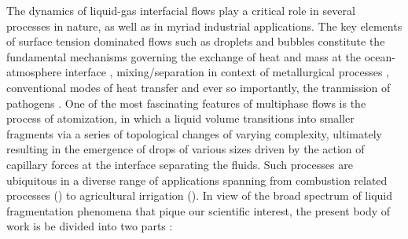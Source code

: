 The dynamics of liquid-gas interfacial flows play a critical role in several processes in nature, 
as well as in myriad industrial applications. 
The key elements of surface tension dominated flows such as droplets and bubbles constitute the  
fundamental mechanisms governing the exchange of heat and mass at the ocean-atmosphere interface \cite{seinfeld1998air,deike}, 
mixing/separation in context of metallurgical processes \cite{johansen1988fluid,metal},  
conventional modes of heat transfer \cite{deckwer1980mechanism,bubble}
and ever so importantly, the tranmission of pathogens \cite{lydia_1,lydia_2}. 
One of the most fascinating features of multiphase flows is the process of atomization, 
in which a liquid volume transitions into smaller fragments via a series of topological 
changes of varying complexity, ultimately resulting in the emergence of drops of various sizes
driven by the action of capillary forces at the interface separating the fluids.  
Such processes are ubiquitous in a diverse range of applications spanning from combustion related processes 
(\cite{lefebvre2017atomization,bayvel1993liquid}) to agricultural irrigation (\cite{lake1977effect,reichenberger2007mitigation}).    
In view of the broad spectrum of liquid fragmentation phenomena that pique our scientific interest, 
the present body of work is be divided into two parts :  


